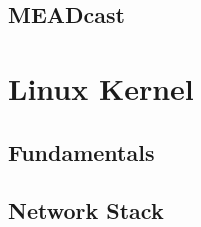 



\subsection{MEADcast} %
\label{sub:MEADcast}


\section{Linux Kernel} %
\label{sec:Linux Kernel}

\subsection{Fundamentals} %
\label{sub:Fundamentals}


\subsection{Network Stack} %
\label{sub:Network Stack}


